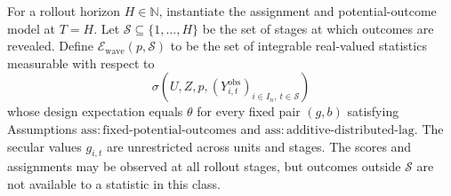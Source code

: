For a rollout horizon \(H\in\mathbb N\), instantiate the assignment and potential-outcome model at \(T=H\).  Let \(\mathcal S\subseteq\{1,\ldots,H\}\) be the set of stages at which outcomes are revealed.  Define \(\mathcal E_{\mathrm{wave}}(p,\mathcal S)\) to be the set of integrable real-valued statistics measurable with respect to
\[
 \sigma\!\left(U,Z,p,
       (Y^{\mathrm{obs}}_{i,t})_{i\in I_n,\ t\in\mathcal S}\right)
\]
whose design expectation equals \(\theta\) for every fixed pair \((g,b)\) satisfying Assumptions \(\mathrm{ass:fixed\text{-}potential\text{-}outcomes}\) and \(\mathrm{ass:additive\text{-}distributed\text{-}lag}\).  The secular values \(g_{i,t}\) are unrestricted across units and stages.  The scores and assignments may be observed at all rollout stages, but outcomes outside \(\mathcal S\) are not available to a statistic in this class.